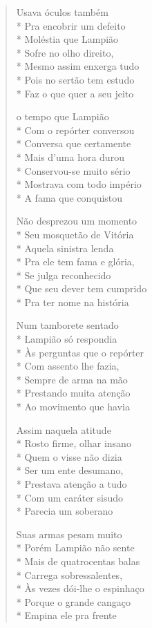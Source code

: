\begin{verse}
Usava óculos também\\*
Pra encobrir um defeito\\*
Moléstia que Lampião\\*
Sofre no olho direito,\\*
Mesmo assim enxerga tudo\\*
Pois no sertão tem estudo\\*
Faz o que quer a seu jeito

o tempo que Lampião\\*
Com o repórter conversou\\*
Conversa que certamente\\*
Mais d'uma hora durou\\*
Conservou-se muito sério\\*
Mostrava com todo império\\*
A fama que conquistou

Não desprezou um momento\\*
Seu mosquetão de Vitória\\*
Aquela sinistra lenda\\*
Pra ele tem fama e glória,\\*
Se julga reconhecido\\*
Que seu dever tem cumprido\\*
Pra ter nome na história

Num tamborete sentado\\*
Lampião só respondia\\*
Às perguntas que o repórter\\*
Com assento lhe fazia,\\*
Sempre de arma na mão\\*
Prestando muita atenção\\*
Ao movimento que havia

Assim naquela atitude\\*
Rosto firme, olhar insano\\*
Quem o visse não dizia\\*
Ser um ente desumano,\\*
Prestava atenção a tudo\\*
Com um caráter sisudo\\*
Parecia um soberano

Suas armas pesam muito\\*
Porém Lampião não sente\\*
Mais de quatrocentas balas\\*
Carrega sobressalentes,\\*
Às vezes dói-lhe o espinhaço\\*
Porque o grande cangaço\\*
Empina ele pra frente


\end{verse}
